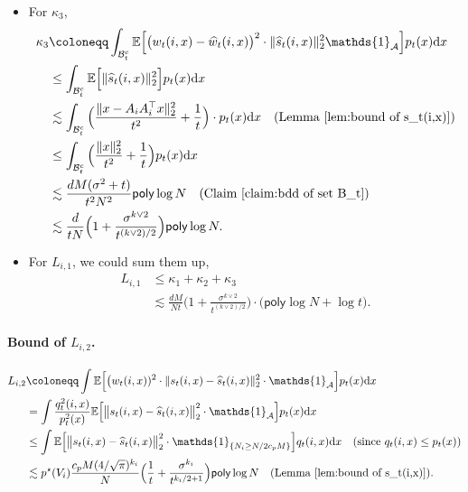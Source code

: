 \documentclass{article}
\newcommand{\ind}{\mathds{1}}
\newcommand{\defn}{\coloneqq}
\newcommand{\bE}{\mathbb{E}}
\newcommand{\diff}{\,\mathrm{d}}
\newcommand{\polylog}{\mathsf{poly}\log}
\theoremstyle{plain}
\theoremstyle{remark}
\begin{document}
\begin{itemize}
    \item For $\kappa_3$, 
    \begin{align*}
        \kappa_3 &\defn \int_{\mathcal{B}_t^c} \mathbb{E} \Big[  \big(w_t(i,x)-\widehat{w}_t(i,x)\big)^2 \cdot \|\widehat{s}_t(i,x) \|_2^2 \ind_{\mathcal{A}}\Big] p_t(x) \!\diff x \\
        &\leq \int_{\mathcal{B}_t^c} \mathbb{E} \Big[   \|\widehat{s}_t(i,x) \|_2^2\Big] p_t(x) \!\diff x \\
        & \lesssim \int_{\mathcal{B}_t^c} \Big( \frac{\| x-A_iA_i^{\top}x\|_2^2}{t^2} + \frac{1}{t}\Big) \cdot p_t(x)\!\diff x \quad (\text{Lemma \ref{lem:bound of s_t(i,x)}}) \\
        &\leq \int_{\mathcal{B}_t^c} \Big( \frac{\|x\|_2^2}{t^2} + \frac{1}{t} \Big) p_t(x)\!\diff x \\
        &\lesssim \frac{dM(\sigma^2+t)}{t^2N^2} \polylog N  \quad (\text{Claim \ref{claim:bdd of set B_t}}) \\
        &\lesssim \frac{d}{tN} \Big( 1+\frac{\sigma^{k\vee2}}{t^{{(k\vee2)}/2}}\Big)\polylog N .
    \end{align*}
    

     \item For $L_{i,1}$, we could sum them up, 
    \begin{align*}
        L_{i,1} &\leq \kappa_1 + \kappa_2 + \kappa_3\\ 
        &\lesssim \frac{dM}{Nt} \Big( 1+\frac{\sigma^{k\vee2}}{t^{{(k\vee2)}/2}}\Big) \cdot \big(\polylog N+\log t\big) .
    \end{align*}
\end{itemize}

\paragraph*{Bound of $L_{i,2}$.}
\begin{align*}
    L_{i,2} &\defn \int \mathbb{E} \Big[  \big(w_t(i,x))^2 \cdot \| s_t(i,x) - \widehat{s}_t(i,x) \|_2^2 \cdot \ind_{\mathcal{A}}\Big] p_t(x) \!\diff x \\
    &= \int \frac{q_t^2(i,x)}{p_t^2(x)}  \mathbb{E} \Big[ \big\| s_t(i,x) - \widehat{s}_t(i,x) \big\|_2^2\cdot \ind_{\mathcal{A}} \Big] p_t(x) \!\diff x \\
    & \leq \int  \bE \Big[ \big\| s_t(i,x) - \widehat{s}_t(i,x)\big \|_2^2 \cdot \ind_{\{ N_i\geq N/2c_{p}M\}} \Big] q_t(i,x) \! \diff x \quad (\text{since }q_t(i,x) \leq p_t(x)) \\
    &\lesssim p^\star(V_i) \frac{c_{p}M(4/\sqrt{\pi})^{k_i} }{N} \Big( \frac{1}{t} + \frac{\sigma^{k_i}}{t^{k_i/2+1}}\Big) \polylog N  \quad (\text{Lemma \ref{lem:bound of s_t(i,x)}}).
\end{align*}
\end{document}
